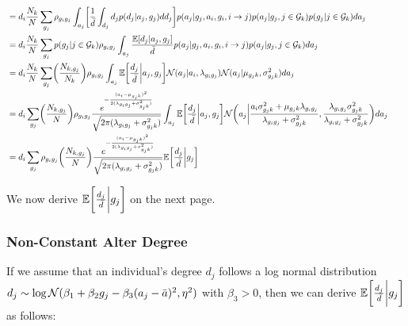 \documentclass[12pt]{article}
\begin{document}
\begin{align}
&& \\\nonumber
&= d_i \frac{N_k}{N} \sum_{g_j} \rho_{g_ig_j} \int_{a_j} 
\biggl[ \frac{1}{\bar{d}} \int_{d_j} d_j p(d_j | a_j, g_j) dd_j \biggr] 
p(a_j | g_j, a_i, g_i, i \to j) p(a_j | g_j, j \in \mathcal{G}_k) p(g_j | j \in \mathcal{G}_k)  da_j 
&& \\\nonumber
&= d_i \frac{N_k}{N} \sum_{g_j} p(g_j | j \in \mathcal{G}_k) \rho_{g_ig_j} 
\int_{a_j} \frac{ \mathbb{E}[d_j | a_j, g_j] }{ \bar{d} }  p(a_j | g_j, a_i, g_i, i \to j) p(a_j | g_j, j \in \mathcal{G}_k) da_j 
&& \\\nonumber
&= d_i \frac{N_k}{N} 
\sum_{g_j} \biggl( \frac{N_{k, g_j}}{N_k} \biggr) \rho_{g_ig_j} 
\int_{a_j} \mathbb{E}\biggl[ \frac{d_j}{\bar{d}} \biggl| a_j, g_j \biggr]  \mathcal{N}(a_j | a_i, \lambda_{g_ig_j}) \mathcal{N}(a_j | \mu_{g_jk}, \sigma_{g_jk}^2) da_j 
&& \\\nonumber
&= d_i \sum_{g_j} \biggl( \frac{N_{k, g_j}}{N} \biggr)  \rho_{g_ig_j} 
\frac{ e^{ -\frac{(a_i - \mu_{g_jk})^2 } { 2(\lambda_{g_ig_j} + \sigma_{g_jk}^2) } } } { \sqrt{ 2\pi (\lambda_{g_ig_j} + \sigma_{g_jk}^2) } }  
\int_{a_j}  \mathbb{E}\biggl[ \frac{d_j}{\bar{d}} \biggl| a_j, g_j \biggr] 
\mathcal{N} \biggl(a_j \biggl| \frac{a_i \sigma_{g_jk}^2 + \mu_{g_jk} \lambda_{g_ig_j}}{\lambda_{g_ig_j} + \sigma_{g_jk}^2}, \frac{\lambda_{g_ig_j} \sigma_{g_jk}^2}{\lambda_{g_ig_j} + \sigma_{g_jk}^2} \biggr) da_j 
&& \\\nonumber
&= d_i \sum_{g_j} \rho_{g_ig_j} \biggl( \frac{N_{k, g_j}}{N} \biggr)
\frac{ e^{ -\frac{(a_i - \mu_{g_jk})^2 } { 2(\lambda_{g_ig_j} + \sigma_{g_jk}^2) } } } { \sqrt{ 2\pi (\lambda_{g_ig_j} + \sigma_{g_jk}^2) } }  
\mathbb{E}\biggl[ \frac{d_j}{\bar{d}} \biggl| g_j \biggr] 
\end{align}

\noindent We now derive $\mathbb{E}\biggl[ \frac{d_j}{\bar{d}} \biggl| g_j \biggr]$ on the next page.

\pagebreak
\subsubsection{Non-Constant Alter Degree}

\noindent  If we assume that an individual's degree $d_j$ follows a log normal distribution $ d_j \sim \log\mathcal{N}(\beta_1 + \beta_2 g_j - \beta_3 (a_j - \bar{a})^2, \eta^2)$ with $\beta_3 > 0 $, then we can derive $\mathbb{E}\biggl[ \frac{d_j}{\bar{d}} \biggl| g_j \biggr]$ as follows:
\end{document}
